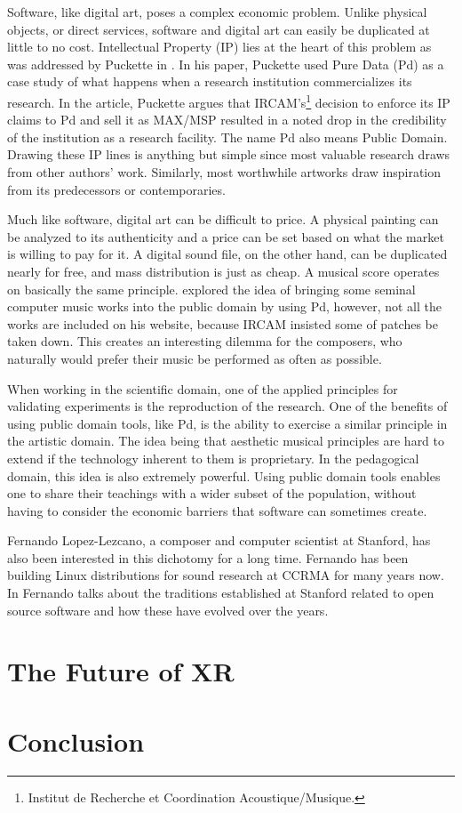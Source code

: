Software, like digital art, poses a complex economic problem. Unlike physical objects, or direct services, software and digital art can easily be duplicated at little to no cost. Intellectual Property (IP) lies at the heart of this problem as was addressed by Puckette in \cite{puckette2004owns}. In his paper, Puckette used Pure Data (Pd) as a case study of what happens when a research institution commercializes its research. In the article, Puckette argues that IRCAM's\footnote{Institut de Recherche et Coordination Acoustique/Musique.} decision to enforce its IP claims to Pd and sell it as MAX/MSP resulted in a noted drop in the credibility of the institution as a research facility. The name Pd also means Public Domain. Drawing these IP lines is anything but simple since most valuable research draws from other authors' work. Similarly, most worthwhile artworks draw inspiration from its predecessors or contemporaries.

Much like software, digital art can be difficult to price. A physical painting can be analyzed to its authenticity and a price can be set based on what the market is willing to pay for it. A digital sound file, on the other hand, can be duplicated nearly for free, and mass distribution is just as cheap. A musical score operates on basically the same principle. \cite{puckette2001new} explored the idea of bringing some seminal computer music works into the public domain by using Pd, however, not all the works are included on his website, because IRCAM insisted some of patches be taken down. This creates an interesting dilemma for the composers, who naturally would prefer their music be performed as often as possible. 

When working in the scientific domain, one of the applied principles for validating experiments is the reproduction of the research. One of the benefits of using public domain tools, like Pd, is the ability to exercise a similar principle in the artistic domain. The idea being that aesthetic musical principles are hard to extend if the technology inherent to them is proprietary. In the pedagogical domain, this idea is also extremely powerful. Using public domain tools enables one to share their teachings with a wider subset of the population, without having to consider the economic barriers that software can sometimes create. 

Fernando Lopez-Lezcano, a composer and computer scientist at Stanford, has also been interested in this dichotomy for a long time. Fernando has been building Linux distributions for sound research at CCRMA for many years now. In \cite{CEC-eCon28-online} Fernando talks about the traditions established at Stanford related to open source software and how these have evolved over the years. 


\section{The Future of XR}
\section{Conclusion}
